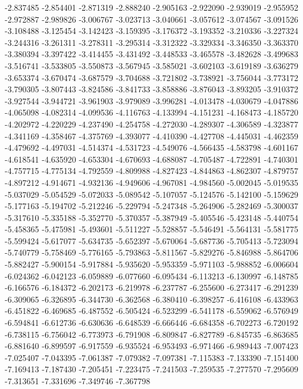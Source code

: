 -2.837485
-2.854401
-2.871319
-2.888240
-2.905163
-2.922090
-2.939019
-2.955952
-2.972887
-2.989826
-3.006767
-3.023713
-3.040661
-3.057612
-3.074567
-3.091526
-3.108488
-3.125454
-3.142423
-3.159395
-3.176372
-3.193352
-3.210336
-3.227324
-3.244316
-3.261311
-3.278311
-3.295314
-3.312322
-3.329334
-3.346350
-3.363370
-3.380394
-3.397422
-3.414455
-3.431492
-3.448533
-3.465578
-3.482628
-3.499683
-3.516741
-3.533805
-3.550873
-3.567945
-3.585021
-3.602103
-3.619189
-3.636279
-3.653374
-3.670474
-3.687579
-3.704688
-3.721802
-3.738921
-3.756044
-3.773172
-3.790305
-3.807443
-3.824586
-3.841733
-3.858886
-3.876043
-3.893205
-3.910372
-3.927544
-3.944721
-3.961903
-3.979089
-3.996281
-4.013478
-4.030679
-4.047886
-4.065098
-4.082314
-4.099536
-4.116763
-4.133994
-4.151231
-4.168473
-4.185720
-4.202972
-4.220229
-4.237490
-4.254758
-4.272030
-4.289307
-4.306589
-4.323877
-4.341169
-4.358467
-4.375769
-4.393077
-4.410390
-4.427708
-4.445031
-4.462359
-4.479692
-4.497031
-4.514374
-4.531723
-4.549076
-4.566435
-4.583798
-4.601167
-4.618541
-4.635920
-4.653304
-4.670693
-4.688087
-4.705487
-4.722891
-4.740301
-4.757715
-4.775134
-4.792559
-4.809988
-4.827423
-4.844863
-4.862307
-4.879757
-4.897212
-4.914671
-4.932136
-4.949606
-4.967081
-4.984560
-5.002045
-5.019535
-5.037029
-5.054529
-5.072033
-5.089542
-5.107057
-5.124576
-5.142100
-5.159629
-5.177163
-5.194702
-5.212246
-5.229794
-5.247348
-5.264906
-5.282469
-5.300037
-5.317610
-5.335188
-5.352770
-5.370357
-5.387949
-5.405546
-5.423148
-5.440754
-5.458365
-5.475981
-5.493601
-5.511227
-5.528857
-5.546491
-5.564131
-5.581775
-5.599424
-5.617077
-5.634735
-5.652397
-5.670064
-5.687736
-5.705413
-5.723094
-5.740779
-5.758469
-5.776165
-5.793863
-5.811567
-5.829276
-5.846988
-5.864706
-5.882427
-5.900154
-5.917884
-5.935620
-5.953359
-5.971103
-5.988852
-6.006604
-6.024362
-6.042123
-6.059889
-6.077660
-6.095434
-6.113213
-6.130997
-6.148785
-6.166576
-6.184372
-6.202173
-6.219978
-6.237787
-6.255600
-6.273417
-6.291239
-6.309065
-6.326895
-6.344730
-6.362568
-6.380410
-6.398257
-6.416108
-6.433963
-6.451822
-6.469685
-6.487552
-6.505424
-6.523299
-6.541178
-6.559062
-6.576949
-6.594841
-6.612736
-6.630636
-6.648539
-6.666446
-6.684358
-6.702273
-6.720192
-6.738115
-6.756042
-6.773973
-6.791908
-6.809847
-6.827789
-6.845735
-6.863685
-6.881640
-6.899597
-6.917559
-6.935524
-6.953493
-6.971466
-6.989443
-7.007423
-7.025407
-7.043395
-7.061387
-7.079382
-7.097381
-7.115383
-7.133390
-7.151400
-7.169413
-7.187430
-7.205451
-7.223475
-7.241503
-7.259535
-7.277570
-7.295609
-7.313651
-7.331696
-7.349746
-7.367798
